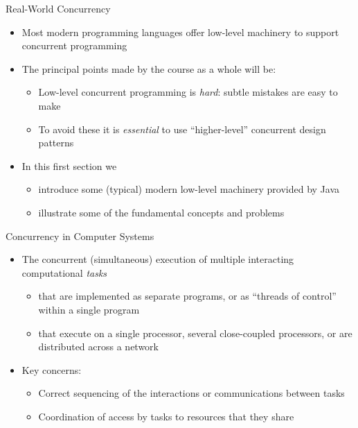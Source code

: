 \documentclass{concdistfoils}
\def\heading#1{\begin{cframed}[8.8in]{#1}\end{cframed}}
\begin{document}
\begin{section}{Real-World Concurrency}
\begin{slide}
\begin{itemize}
\item Most modern programming languages offer low-level machinery to support concurrent programming
\vfill
\item The principal points made by the course as a whole will be:
\begin{itemize}
\item Low-level concurrent programming is \textit{hard}: subtle mistakes are easy to make
\item To avoid these it is \textit{essential} to use ``higher-level'' 
      concurrent design patterns 
\end{itemize}
\vfill
\item In this first section we 
\begin{itemize}
\item introduce some (typical) modern low-level machinery provided by Java
\item illustrate some of the fundamental concepts and problems 
\end{itemize}
\end{itemize}
\end{slide}

\begin{slide}
\heading{Concurrency in Computer Systems}
\vfill
\begin{itemize}
\item The concurrent (simultaneous) execution of multiple interacting computational \textit{tasks}
\begin{itemize}
\item that are implemented as separate programs, or as  ``threads of control'' within a single program
\item that execute on a single processor, several close-coupled processors, or 
      are distributed across a network
\end{itemize}
\vfill
\item Key concerns:
\begin{itemize}
\item Correct sequencing of the interactions or communications between tasks
\item Coordination of access by tasks to resources that they share  
\end{itemize}
\end{itemize}
\end{slide}


\end{section}
\end{document}
